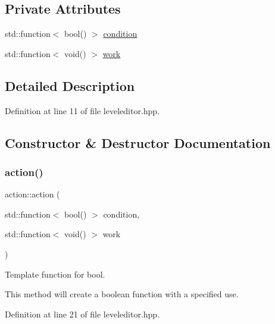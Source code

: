 \subsection*{Private Attributes}
\begin{DoxyCompactItemize}
\item 
std\+::function$<$ bool() $>$ \hyperlink{classaction_a949abf979a5255f54e88a6a4273afebe}{condition}
\item 
std\+::function$<$ void() $>$ \hyperlink{classaction_a1cab66c9a7adf408ebb3734e5d95315b}{work}
\end{DoxyCompactItemize}


\subsection{Detailed Description}


Definition at line 11 of file leveleditor.\+hpp.



\subsection{Constructor \& Destructor Documentation}
\mbox{\label{classaction_a326b1acaf626d97dbaa9c52f6f3f90e4}} 
\subsubsection{\texorpdfstring{action()}{action()}\hspace{0.1cm}{\footnotesize\ttfamily [1/4]}}
{\footnotesize\ttfamily action\+::action (\begin{DoxyParamCaption}\item[{std\+::function$<$ bool() $>$}]{condition,  }\item[{std\+::function$<$ void() $>$}]{work }\end{DoxyParamCaption})\hspace{0.3cm}{\ttfamily [inline]}}



Template function for bool. 

This method will create a boolean function with a specified use. ~\newline
 

Definition at line 21 of file leveleditor.\+hpp.

\mbox{\label{classaction_af9e6424028e398ca05829d3538789840}} 
